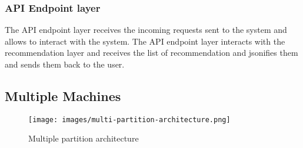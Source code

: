 \subsubsection{API Endpoint layer}
\label{subsubsec:api-endpoint-layer}
The API endpoint layer receives the incoming requests sent to the system and allows to interact with the system. The API endpoint layer interacts with the recommendation layer and receives the list of recommendation and jsonifies them and sends them back to the user. 

\subsection{Multiple Machines}
\label{Multiple Machines}

\begin{figure}[!h]
	\centering
	\texttt{[image: images/multi-partition-architecture.png]}
	\caption{Multiple partition architecture}
	\label{fig:multiple-machine-architecture}
\end{figure}

